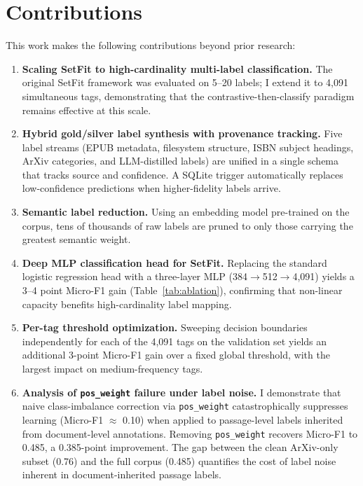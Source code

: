 \documentclass[10pt,journal,compsoc]{IEEEtran}
\newcommand{\NumTagsAblation}{4,091}
\newcommand{\MLPHiddenDim}{512}
\newcommand{\EncoderDim}{384}
\newcommand{\MicroF}{0.485}
\newcommand{\ArXivMicroF}{0.76}
\newcommand{\PosWeightMicroF}{0.10}
\newcommand{\PosWeightDelta}{0.385}
\begin{document}
	\section{Contributions}
	This work makes the following contributions beyond prior research:
	\begin{enumerate}
		\item \textbf{Scaling SetFit to high-cardinality multi-label classification.}
		The original SetFit framework \cite{tunstall_efficient_2022} was evaluated on
		5--20 labels; I extend it to \NumTagsAblation{} simultaneous tags, demonstrating that the
		contrastive-then-classify paradigm remains effective at this scale.
		
		\item \textbf{Hybrid gold/silver label synthesis with provenance tracking.}
		Five label streams (EPUB metadata, filesystem structure, ISBN subject headings,
		ArXiv categories, and LLM-distilled labels) are unified in a single schema that
		tracks source and confidence. A SQLite trigger automatically replaces
		low-confidence predictions when higher-fidelity labels arrive.
		
		\item \textbf{Semantic label reduction.} Using an embedding model pre-trained
		on the corpus, tens of thousands of raw labels are pruned to only those carrying
		the greatest semantic weight.
		
		\item \textbf{Deep MLP classification head for SetFit.} Replacing the standard
		logistic regression head with a three-layer MLP (\EncoderDim{}$\rightarrow$\MLPHiddenDim{}$\rightarrow$\NumTagsAblation{}) yields a 3--4
		point Micro-F1 gain (Table~\ref{tab:ablation}), confirming that non-linear
		capacity benefits high-cardinality label mapping.
		
		\item \textbf{Per-tag threshold optimization.} Sweeping decision boundaries
		independently for each of the \NumTagsAblation{} tags on the validation set yields an
		additional 3-point Micro-F1 gain over a fixed global threshold, with the
		largest impact on medium-frequency tags.
		
		\item \textbf{Analysis of \texttt{pos\_weight} failure under label noise.} I demonstrate that naive class-imbalance correction via \texttt{pos\_weight} catastrophically suppresses learning (Micro-F1 $\approx$ \PosWeightMicroF{}) when applied to passage-level labels inherited from document-level annotations. Removing \texttt{pos\_weight} recovers Micro-F1 to \MicroF{}, a \PosWeightDelta{}-point improvement. The gap between the clean ArXiv-only subset (\ArXivMicroF{}) and the full corpus (\MicroF{}) quantifies the cost of label noise inherent in document-inherited passage labels.
	\end{enumerate}
	
\end{document}
